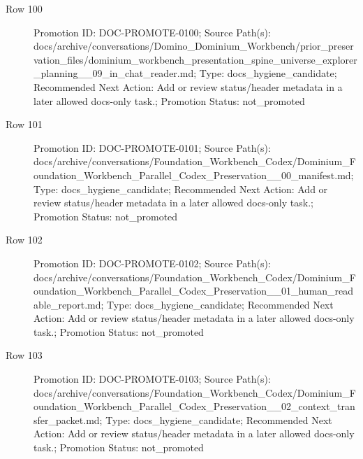 \documentclass[9pt,a4paper,openany]{book}
\begin{document}
\begin{description}
\item[Row 100] Promotion ID: DOC-\allowbreak{}PROMOTE-\allowbreak{}0100; Source Path(s): docs/\allowbreak{}archive/\allowbreak{}conversations/\allowbreak{}Domino\_\allowbreak{}Dominium\_\allowbreak{}Workbench/\allowbreak{}prior\_\allowbreak{}preservation\_\allowbreak{}files/\allowbreak{}dominium\_\allowbreak{}workbench\_\allowbreak{}presentation\_\allowbreak{}spine\_\allowbreak{}universe\_\allowbreak{}explorer\_\allowbreak{}planning\_\allowbreak{}\_\allowbreak{}09\_\allowbreak{}in\_\allowbreak{}chat\_\allowbreak{}reader.\allowbreak{}md; Type: docs\_\allowbreak{}hygiene\_\allowbreak{}candidate; Recommended Next Action: Add or review status/\allowbreak{}header metadata in a later allowed docs-\allowbreak{}only task.\allowbreak{}; Promotion Status: not\_\allowbreak{}promoted
\item[Row 101] Promotion ID: DOC-\allowbreak{}PROMOTE-\allowbreak{}0101; Source Path(s): docs/\allowbreak{}archive/\allowbreak{}conversations/\allowbreak{}Foundation\_\allowbreak{}Workbench\_\allowbreak{}Codex/\allowbreak{}Dominium\_\allowbreak{}Foundation\_\allowbreak{}Workbench\_\allowbreak{}Parallel\_\allowbreak{}Codex\_\allowbreak{}Preservation\_\allowbreak{}\_\allowbreak{}00\_\allowbreak{}manifest.\allowbreak{}md; Type: docs\_\allowbreak{}hygiene\_\allowbreak{}candidate; Recommended Next Action: Add or review status/\allowbreak{}header metadata in a later allowed docs-\allowbreak{}only task.\allowbreak{}; Promotion Status: not\_\allowbreak{}promoted
\item[Row 102] Promotion ID: DOC-\allowbreak{}PROMOTE-\allowbreak{}0102; Source Path(s): docs/\allowbreak{}archive/\allowbreak{}conversations/\allowbreak{}Foundation\_\allowbreak{}Workbench\_\allowbreak{}Codex/\allowbreak{}Dominium\_\allowbreak{}Foundation\_\allowbreak{}Workbench\_\allowbreak{}Parallel\_\allowbreak{}Codex\_\allowbreak{}Preservation\_\allowbreak{}\_\allowbreak{}01\_\allowbreak{}human\_\allowbreak{}readable\_\allowbreak{}report.\allowbreak{}md; Type: docs\_\allowbreak{}hygiene\_\allowbreak{}candidate; Recommended Next Action: Add or review status/\allowbreak{}header metadata in a later allowed docs-\allowbreak{}only task.\allowbreak{}; Promotion Status: not\_\allowbreak{}promoted
\item[Row 103] Promotion ID: DOC-\allowbreak{}PROMOTE-\allowbreak{}0103; Source Path(s): docs/\allowbreak{}archive/\allowbreak{}conversations/\allowbreak{}Foundation\_\allowbreak{}Workbench\_\allowbreak{}Codex/\allowbreak{}Dominium\_\allowbreak{}Foundation\_\allowbreak{}Workbench\_\allowbreak{}Parallel\_\allowbreak{}Codex\_\allowbreak{}Preservation\_\allowbreak{}\_\allowbreak{}02\_\allowbreak{}context\_\allowbreak{}transfer\_\allowbreak{}packet.\allowbreak{}md; Type: docs\_\allowbreak{}hygiene\_\allowbreak{}candidate; Recommended Next Action: Add or review status/\allowbreak{}header metadata in a later allowed docs-\allowbreak{}only task.\allowbreak{}; Promotion Status: not\_\allowbreak{}promoted

\end{description}
\end{document}
